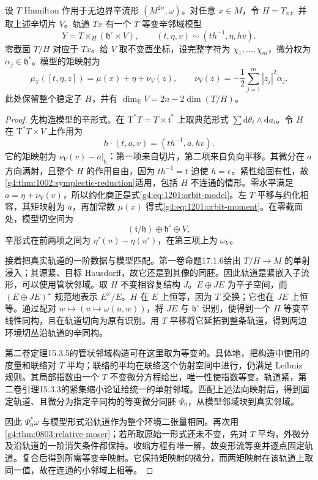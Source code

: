 \begin{theorem}\label{g4:thm:1201:orbit-normal-form}
	设 \(T\) Hamilton 作用于无边界辛流形 \((M^{2n},\omega)\)。对任意 \(x\in M\)，令 \(H=T_x\)，并取上述辛切片 \(V\)。轨道 \(Tx\) 有一个 \(T\) 等变辛邻域模型
	\begin{equation}\label{g4:eq:1201:orbit-model}
		Y=T\times_H(\mathfrak h^\circ\times V),
		\qquad
		(t,\eta,v)\sim(th^{-1},\eta,hv).
	\end{equation}
	零截面 \(T/H\) 对应于 \(Tx\)。给 \(V\) 取不变酉坐标，设完整字符为 \(\chi_1,\ldots,\chi_m\)，微分权为 \(\alpha_j\in\mathfrak h^*\)。模型的矩映射为
	\begin{equation}\label{g4:eq:1201:orbit-moment}
		\mu_Y([t,\eta,z])=\mu(x)+\eta+\nu_V(z),
		\qquad \nu_V(z)=-\frac12\sum_{j=1}^m|z_j|^2\alpha_j.
	\end{equation}
	此处保留整个稳定子 \(H\)，并有 \(\dim_{\mathbb R}V=2n-2\dim(T/H)\)。
\end{theorem}
\begin{proof}
	先构造模型的辛形式。在 \(\mathrm T^*T=T\times\mathfrak t^*\) 上取典范形式 \(\sum\mathrm d\theta_i\wedge\mathrm da_i\)。令 \(H\) 在 \(\mathrm T^*T\times V\) 上作用为
	\[
		h\cdot(t,a,v)=(th^{-1},a,hv).
	\]
	它的矩映射为 \(\nu_V(v)-a|_{\mathfrak h}\)：第一项来自切片，第二项来自负向平移。其微分在 \(a\) 方向满射，且整个 \(H\) 的作用自由，因为 \(th^{-1}=t\) 迫使 \(h=e\)。紧性给固有性，故\cref{g4:thm:1002:symplectic-reduction}适用，包括 \(H\) 不连通的情形。零水平满足 \(a=\eta+\nu_V(v)\)，所以约化商正是式\eqref{g4:eq:1201:orbit-model}。左 \(T\) 平移与约化相容，其矩映射为 \(a\)，再加常数 \(\mu(x)\) 得式\eqref{g4:eq:1201:orbit-moment}。在零截面处，模型切空间为
	\[
		(\mathfrak t/\mathfrak h)\oplus\mathfrak h^\circ\oplus V,
	\]
	辛形式在前两项之间为 \(\eta'(u)-\eta(u')\)，在第三项上为 \(\omega_V\)。

	接着把真实轨道的一阶数据与模型匹配。第一卷命题17.1.6给出 \(T/H\to M\) 的单射浸入；其源紧、目标 Hausdorff，故它还是到其像的同胚。因此轨道是紧嵌入子流形，可以使用管状邻域。取 \(H\) 不变相容复结构 \(J\)。\(E\oplus JE\) 为辛子空间，而 \((E\oplus JE)^\omega\) 规范地表示 \(E^\omega/E\)。\(H\) 在 \(E\) 上恒等，因为 \(T\) 交换；它也在 \(JE\) 上恒等。通过配对 \(w\mapsto(u\mapsto\omega(u,w))\)，将 \(JE\) 与 \(\mathfrak h^\circ\) 识别，便得到一个 \(H\) 等变辛线性同构，且在轨道切向为原有识别。用 \(T\) 平移将它延拓到整条轨道，得到两边环境切丛沿轨道的辛同构。

	第二卷定理15.3.5的管状邻域构造可在这里取为等变的。具体地，把构造中使用的度量和联络对 \(T\) 平均；联络的平均在联络这个仿射空间中进行，仍满足 Leibniz 规则。其局部指数由一个 \(T\) 不变微分方程给出，唯一性使指数等变。轨道紧，第二卷引理15.3.3的紧集缩小论证给统一的单射邻域。匹配上述法向映射后，得到固定轨道、且微分为指定辛同构的等变微分同胚 \(\Psi_0\)，从模型邻域映到真实邻域。

	因此 \(\Psi_0^*\omega\) 与模型形式沿轨道作为整个环境二张量相同。再次用\cref{g4:thm:0803:relative-moser}；若所取原始一形式还未不变，先对 \(T\) 平均，外微分及沿轨道的一阶消失条件都保持。收缩方程有唯一解，故变形流等变并逐点固定轨道。复合后得到所需等变辛映射。它保持矩映射的微分，而两矩映射在该轨道上取同一值，故在连通的小邻域上相等。
\end{proof}

